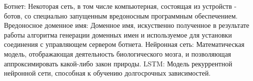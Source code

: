 
\noindent Ботнет: Некоторая сеть, в том числе компьютерная, состоящая из устройств - ботов, со специально запущенным вредоносным программным обеспечением.
\newline
\linebreak
\noindent Вредоносное доменное имя: Доменное имя, искуственно полученное в результате работы алгоритма генерации доменных имен и используемое для установки соединения с управляющем сервером ботнета.
\newline
\linebreak
\noindent Нейронная сеть: Математическая модель, отображающая деятельность биологического мозга, и позволяющая аппроксимировать какой-либо закон природы.
\newline
\linebreak
\noindent LSTM: Модель рекуррентной нейронной сети, способная к обучению долгосрочных зависимостей.
\clearpage
